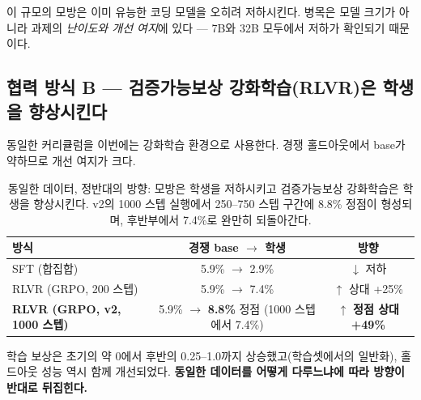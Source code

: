 \documentclass[11pt]{article}
\begin{document}
이 규모의 모방은 이미 유능한 코딩 모델을 오히려 저하시킨다. 병목은 모델 크기가 아니라 과제의 \emph{난이도와 개선 여지}에 있다 --- 7B와 32B 모두에서 저하가 확인되기 때문이다.

\subsection{협력 방식 B --- 검증가능보상 강화학습(RLVR)은 학생을 향상시킨다}
\label{sec:rlvr}
동일한 커리큘럼을 이번에는 강화학습 환경으로 사용한다. 경쟁 홀드아웃에서 base가 약하므로 개선 여지가 크다.
\begin{table}[h]\centering
\begin{tabular}{lcc}
\toprule
방식 & 경쟁 base $\rightarrow$ 학생 & 방향 \\
\midrule
SFT (합집합)              & 5.9\% $\rightarrow$ 2.9\%          & $\downarrow$ 저하 \\
RLVR (GRPO, 200 스텝)     & 5.9\% $\rightarrow$ 7.4\%          & $\uparrow$ 상대 +25\% \\
\textbf{RLVR (GRPO, v2, 1000 스텝)} & 5.9\% $\rightarrow$ \textbf{8.8\%} 정점 (1000 스텝에서 7.4\%) & $\uparrow$ \textbf{정점 상대 +49\%} \\
\bottomrule
\end{tabular}
\caption{동일한 데이터, 정반대의 방향: 모방은 학생을 저하시키고 검증가능보상 강화학습은 학생을 향상시킨다. v2의 1000 스텝 실행에서 250--750 스텝 구간에 8.8\% 정점이 형성되며, 후반부에서 7.4\%로 완만히 되돌아간다.}
\end{table}

학습 보상은 초기의 약 0에서 후반의 0.25--1.0까지 상승했고(학습셋에서의 일반화), 홀드아웃 성능 역시 함께 개선되었다. \textbf{동일한 데이터를 어떻게 다루느냐에 따라 방향이 반대로 뒤집힌다.}
\end{document}
